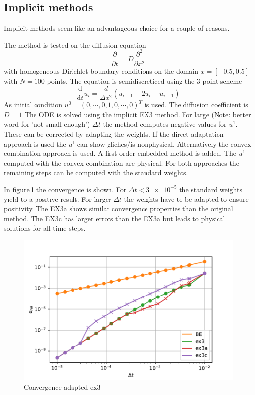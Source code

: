 \documentclass[a4paper]{scrartcl}
\numberwithin{equation}{section}
\theoremstyle{plain}
\theoremstyle{definition}
\numberwithin{theorem}{section}
\newcommand{\dt}{{\Delta t}}
\newcommand{\1}{\mathbbm{1}}
\begin{document}
\subsection{Implicit methods}
Implicit methods seem like an advantageous choice for a couple of reasons.

The method is tested on the diffusion equation 
\begin{equation}
\frac{\partial }{\partial t} = D \frac{\partial^2}{\partial x^2}
\end{equation}
with homogeneous Dirichlet boundary conditions on the domain $x = [-0.5,0.5]$ with $N=100$ points. The equation is semidiscreticed using the 3-point-scheme
\begin{equation}
\frac{\mathrm d}{\mathrm d t} u_i = \frac{d}{\Delta x^2} \left( u_{i-1} - 2u_i + u_{i+1} \right)
\end{equation}
As initial condition $u^0 = (0,\cdots,0,1,0,\cdots,0)^T$ is used. The diffusion coefficient is$D=1$
The ODE is solved using the implicit EX3 method. 
For large (Note: better word for 'not small enough') $\dt$ the method computes negative values for $u^1$.
These can be corrected by adapting the weights. 
If the direct adaptation approach is used the $u^1$ can show gliches/is nonphysical. 
Alternatively the convex combination approach is used. A first order embedded method is added. The $u^1$ computed with the convex combination are physical.
For both approaches the remaining steps can be computed with the standard weights.

In figure\,\ref{fig:conv_impl} the convergence is shown. For $\dt < \num{3e-5} $ the standard weights yield to a positive result. For larger $\dt$ the weights have to be adapted to ensure positivity.
The EX3a shows similar convergence properties than the original method. 
The EX3c has larger errors than the EX3a but leads to physical solutions for all time-steps. 
\begin{figure}[h]
\centering
\includegraphics[scale=0.75]{plots/conv_heat.pdf}
\caption{Convergence adapted ex3}
\label{fig:conv_impl}
\end{figure}
\end{document}
